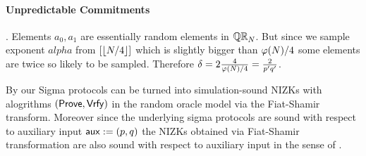 \paragraph{Unpredictable Commitments}. Elements $a_0, a_1$ are essentially random elements in $\mathbb{QR}_N$. But since we sample exponent $alpha$ from $[\left\lfloor N/4 \right\rfloor]$ which is slightly bigger than $\varphi(N)/4$ some elements are twice so likely to be sampled. Therefore $\delta = 2 \frac{4}{\varphi(N)/4} = \frac{2}{p'q'}$.

By  our Sigma protocols can be turned into simulation-sound NIZKs with alogrithms $(\mathsf{Prove}, \mathsf{Vrfy})$ in the random oracle model via the Fiat-Shamir transform. Moreover since the underlying sigma protocols are sound with respect to auxiliary input $\mathsf{aux}:=(p,q)$ the NIZKs obtained via Fiat-Shamir transformation are also sound with respect to auxiliary input in the sense of .




